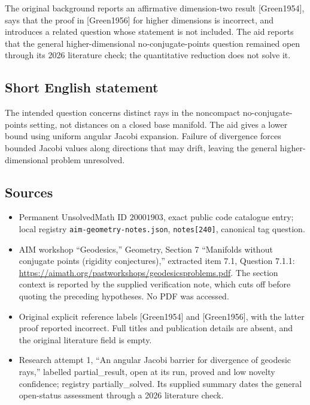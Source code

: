 \documentclass[11pt]{article}
\begin{document}
The original background reports an affirmative dimension-two result [Green1954], says that the proof in [Green1956] for higher dimensions is incorrect, and introduces a related question whose statement is not included. The aid reports that the general higher-dimensional no-conjugate-points question remained open through its 2026 literature check; the quantitative reduction does not solve it.
\subsection{Short English statement}
The intended question concerns distinct rays in the noncompact no-conjugate-points setting, not distances on a closed base manifold. The aid gives a lower bound using uniform angular Jacobi expansion. Failure of divergence forces bounded Jacobi values along directions that may drift, leaving the general higher-dimensional problem unresolved.
\subsection{Sources}
\begin{itemize}
\item Permanent UnsolvedMath ID \(20001903\), exact public code catalogue entry; local registry \texttt{aim-geometry-notes.json}, \texttt{notes[240]}, canonical tag question.
\item AIM workshop ``Geodesics,'' Geometry, Section 7 ``Manifolds without conjugate points (rigidity conjectures),'' extracted item 7.1, Question 7.1.1: \url{https://aimath.org/pastworkshops/geodesicsproblems.pdf}. The section context is reported by the supplied verification note, which cuts off before quoting the preceding hypotheses. No PDF was accessed.
\item Original explicit reference labels [Green1954] and [Green1956], with the latter proof reported incorrect. Full titles and publication details are absent, and the original literature field is empty.
\item Research attempt 1, ``An angular Jacobi barrier for divergence of geodesic rays,'' labelled partial\_result, open at its run, proved and low novelty confidence; registry partially\_solved. Its supplied summary dates the general open-status assessment through a 2026 literature check.
\end{itemize}
\end{document}
